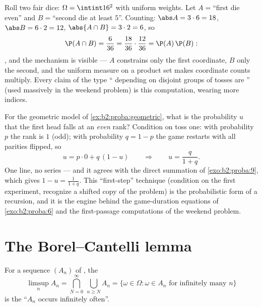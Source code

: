 \begin{example}\label{ex:b2:proba:productindep}
Roll two fair dice: $\Omega = \intint16^2$ with uniform
weights. Let $A = {}$``first die even'' and $B = {}$``second
die at least $5$''. Counting: $\abs A = 3\cdot6 = 18$,
$\abs B = 6\cdot2 = 12$, $\abs{A\cap B} = 3\cdot2 = 6$, so
\[
\P(A\cap B) = \frac6{36} = \frac{18}{36}\cdot\frac{12}{36} =
\P(A)\,\P(B) :
\]
, and the mechanism is visible --- $A$ constrains
only the first coordinate, $B$ only the second, and the
uniform measure on a product set makes coordinate counts
multiply. Every claim of the type `` depending on
disjoint groups of tosses are '' (used massively
in the weekend problem) is this computation, wearing more
indices.
\end{example}

\begin{example}\label{ex:b2:proba:firststep}
For the geometric model of \cref{ex:b2:proba:geometric},
what is the probability $u$ that the first head falls at an
\emph{even} rank? Condition on toss one: with probability
$p$ the rank is $1$ (odd); with probability $q = 1 - p$ the
game restarts with all parities flipped, so
\[
u = p\cdot0 + q\,(1 - u)
\qquad\Longrightarrow\qquad
u = \frac{q}{1 + q} .
\]
One line, no series --- and it agrees with the direct
summation of \cref{exo:b2:proba:9}, which gives $1 - u =
\frac1{1+q}$. This ``first-step'' technique (condition on
the first experiment, recognize a shifted copy of the
problem) is the probabilistic form of a recursion, and it is
the engine behind the game-duration equations of
\cref{exo:b2:proba:6} and the first-passage computations of
the weekend problem.
\end{example}

\section{The Borel--Cantelli lemma}

\begin{definition}\label{def:b2:proba:limsup}
For a sequence $(A_n)$ of , the 
\[
\limsup_n A_n
= \bigcap_{N=0}^{\infty}\ \bigcup_{n \geq N} A_n
= \{\omega \in \Omega : \omega \in A_n
\text{ for infinitely many } n\}
\]
is the  ``$A_n$ occurs infinitely often''.
\end{definition}

